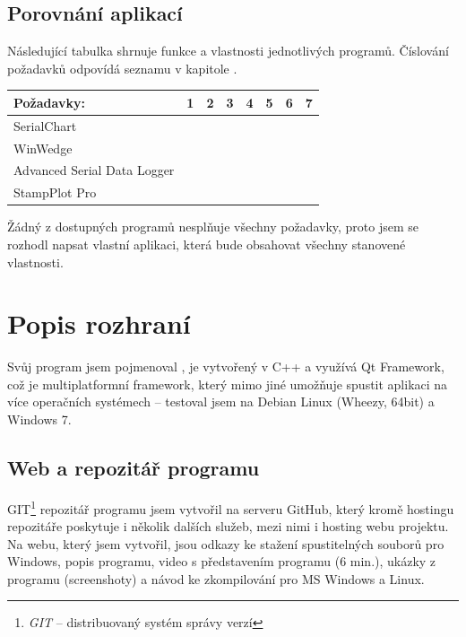 \documentclass[12pt, a4paper, oneside]{article}
\newcommand{\It}{\textit}  %
\newcommand{\Has}{\textcolor{green}{\CheckmarkBold}}
\newcommand{\NoHas}{\textcolor{red}{\XSolidBrush}}
\begin{document}
\subsection{Porovnání aplikací}
Následující tabulka shrnuje funkce a vlastnosti jednotlivých programů. Číslování požadavků odpovídá seznamu v kapitole .

\vspace{5mm}

\begin{tabular}{ | l | l | l | l | l | l | l | l |}
    \hline
    Požadavky:                  & 1      & 2      & 3      & 4      & 5      & 6      & 7      \\ \hline
    SerialChart                 & \Has   & \NoHas & \Has   & \NoHas & \Has   & \Has   & \Has   \\ \hline 
    WinWedge                    & \NoHas & \Has   & \Has   & \NoHas & \NoHas & \NoHas & \NoHas \\ \hline 
    Advanced Serial Data Logger & \NoHas & \Has   & \Has   & \NoHas & \NoHas & \NoHas & \NoHas \\ \hline 
    StampPlot Pro               & \Has   & \Has   & \NoHas & \NoHas & \Has   & \NoHas & \Has   \\ \hline 
\end{tabular}

\vspace{5mm}

Žádný z dostupných programů nesplňuje všechny požadavky, proto jsem se rozhodl napsat vlastní aplikaci, která bude obsahovat všechny stanovené vlastnosti. 

\section{Popis rozhraní}
Svůj program jsem pojmenoval , je vytvořený v C++ a využívá Qt Framework\cite{qtfrm}, což je multiplatformní framework, který mimo jiné umožňuje spustit aplikaci na více operačních systémech -- testoval jsem na Debian Linux\cite{debian} (Wheezy, 64bit) a Windows 7.

\subsection{Web a repozitář programu}
GIT\footnote{\It{GIT} -- distribuovaný systém správy verzí} repozitář programu jsem vytvořil na serveru GitHub\cite{github}, který kromě hostingu repozitáře poskytuje i několik dalších služeb, mezi nimi i hosting webu projektu. Na webu, který jsem vytvořil, jsou odkazy ke stažení spustitelných souborů pro Windows, popis programu, video s představením programu (6 min.), ukázky z programu (screenshoty) a návod ke zkompilování pro MS Windows a Linux.
\end{document}

